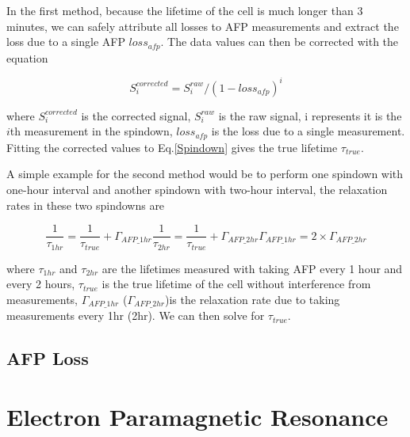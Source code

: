 In the first method, because the lifetime of the cell is much longer than 3 minutes, we can safely attribute all losses to AFP measurements and extract the loss due to a single AFP $loss_{afp}$. The data values can then be corrected with the equation

\begin{equation}
S_{i}^{corrected}=S_{i}^{raw}/(1-loss_{afp})^{i}
\end{equation}

where $S_{i}^{corrected}$ is the corrected signal, $S_{i}^{raw}$ is the raw signal, i represents it is the $i$th measurement in the spindown, $loss_{afp}$ is the loss due to a single measurement. Fitting the corrected values to Eq.\ref{Spindown} gives the true lifetime $\tau_{true}$.

A simple example for the second method would be to perform one spindown with one-hour interval and another spindown with two-hour interval, the relaxation rates in these two spindowns are

\begin{subequations}
	\begin{equation}
	\frac{1}{\tau_{1hr}}=\frac{1}{\tau_{true}}+\Gamma_{AFP\_1hr}
	\end{equation}
	\begin{equation}
	\frac{1}{\tau_{2hr}}=\frac{1}{\tau_{true}}+\Gamma_{AFP\_2hr}
	\end{equation}
	\begin{equation}
	\Gamma_{AFP\_1hr}=2\times \Gamma_{AFP\_2hr}
	\end{equation}
\end{subequations}

where $\tau_{1hr}$ and $\tau_{2hr}$ are the lifetimes measured with taking AFP every 1 hour and every 2 hours, $\tau_{true}$ is the true lifetime of the cell without interference from measurements, $\Gamma_{AFP\_1hr}$ ($\Gamma_{AFP\_2hr}$)is the relaxation rate due to taking measurements every 1hr (2hr). We can then solve for $\tau_{true}$.

\subsection{AFP Loss}



\section{Electron Paramagnetic Resonance}

